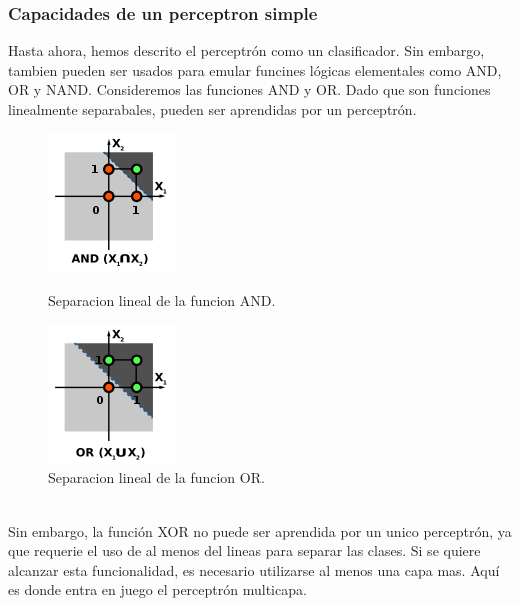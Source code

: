 \subsubsection{Capacidades de un perceptron simple}
Hasta ahora, hemos descrito el perceptrón como un clasificador. Sin embargo, tambien pueden ser usados para emular funcines lógicas elementales como AND, OR y NAND. Consideremos las funciones AND y OR. Dado que son funciones linealmente separabales, pueden ser aprendidas por un perceptrón.
\begin{figure}[htp]
\centering
\begin{minipage}[b]{0.4\textwidth}
    \includegraphics[scale=1]{images/perceptron_and.png}
    \caption{Separacion lineal de la funcion AND.}
  \end{minipage}
\hfill
\begin{minipage}[b]{0.4\textwidth}
    \includegraphics[scale=1]{images/perceptron_or.png}
  \caption{Separacion lineal de la funcion OR.}
  \end{minipage}
\end{figure}
\\Sin embargo, la función XOR no puede ser aprendida por un unico perceptrón, ya que requerie el uso de al menos del lineas para separar las clases. Si se quiere alcanzar esta funcionalidad, es necesario utilizarse al menos una capa mas. Aquí es donde entra en juego el perceptrón multicapa.


